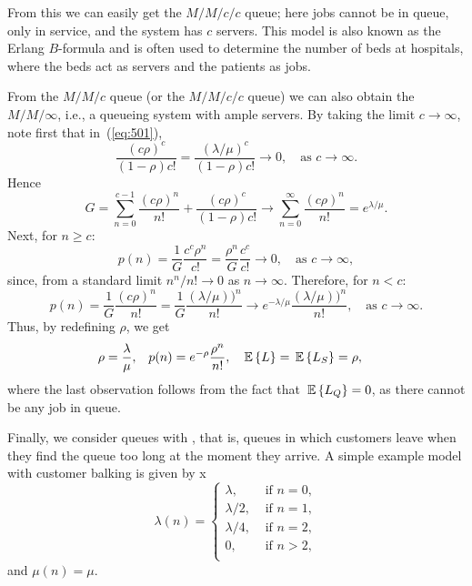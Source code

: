 From this we can easily get the $M/M/c/c$ queue; here jobs cannot be
in queue, only in service, and the system has $c$ servers.  This model
is also known as the Erlang $B$-formula and is often used to determine
the number of beds at hospitals, where the beds act as servers and the
patients as jobs.


From the $M/M/c$ queue (or the $M/M/c/c$ queue) we can also obtain the
$M/M/\infty$, i.e., a queueing system with ample servers. By taking
the limit $c\to\infty$, note first that in~(\ref{eq:501}),
\begin{equation*}
\frac{(c\rho)^c}{(1-\rho)c!} = \frac{(\lambda/\mu)^c}{(1-\rho)c!}\to 0, \quad\text{as } c\to \infty.
\end{equation*}
Hence
\begin{equation*}
G =\sum_{n=0}^{c-1} \frac{(c\rho)^n}{n!} + \frac{(c\rho)^c}{(1-\rho)c!} \to \sum_{n=0}^{\infty} \frac{(c\rho)^n}{n!} = e^{\lambda/\mu}.
\end{equation*}
Next, for $n\geq c$:
\begin{equation*}
  p(n) = \frac{1}G \frac{c^c\rho^n}{c!} =\frac{\rho^n}{G}\frac{c^c}{c!} \to 0, 
\quad\text{as } c\to\infty,
\end{equation*}
since, from a standard limit $n^n/n! \to 0$ as $n\to\infty$. Therefore, for $n<c$: 
\begin{equation*}
  p(n) = \frac{1}G \frac{(c\rho)^n}{n!} = \frac{1}G \frac{(\lambda/\mu))^n}{n!} 
\to e^{-\lambda/\mu}  \frac{(\lambda/\mu))^n}{n!}, \quad\text{as } c\to\infty.
\end{equation*}
Thus, by redefining $\rho$, we get
 \begin{align} 
\rho &= \frac{\lambda}\mu, & p(n) &=  e^{-\rho} \frac{\rho^n}{n!}, & \,\mathbb{E}\left\{L\right\} &= \,\mathbb{E}\left\{L_S\right\} = \rho,
\end{align}
where the last observation follows from the fact that $\,\mathbb{E}\left\{L_Q\right\}=0$, as
there cannot be any job in queue. 


Finally, we consider queues with , that is, queues in
which customers leave when they find the queue too long at the moment
they arrive. A simple example model with  customer balking is given by x
  \begin{equation*}
    \lambda(n) = 
  \begin{cases}
    \lambda, &\text{ if } n=0, \\
    \lambda/2, &\text{ if } n=1, \\
    \lambda/4, &\text{ if } n=2, \\
    0, &\text{ if } n > 2, \\
  \end{cases}
  \end{equation*}
and $\mu(n)=\mu$.   

